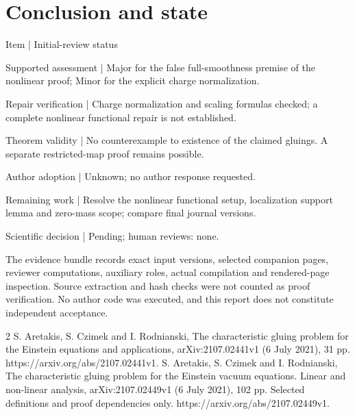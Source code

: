 \documentclass[10pt]{article}
\begin{document}
\section*{Conclusion and state}
Item | Initial-review status\par
Supported assessment | Major for the false full-smoothness premise of the nonlinear proof; Minor for the explicit charge normalization.\par
Repair verification | Charge normalization and scaling formulas checked; a complete nonlinear functional repair is not established.\par
Theorem validity | No counterexample to existence of the claimed gluings. A separate restricted-map proof remains possible.\par
Author adoption | Unknown; no author response requested.\par
Remaining work | Resolve the nonlinear functional setup, localization support lemma and zero-mass scope; compare final journal versions.\par
Scientific decision | Pending; human reviews: none.\par
The evidence bundle records exact input versions, selected companion pages, reviewer computations, auxiliary roles, actual compilation and rendered-page inspection. Source extraction and hash checks were not counted as proof verification. No author code was executed, and this report does not constitute independent acceptance.\par
2 S. Aretakis, S. Czimek and I. Rodnianski, The characteristic gluing problem for the Einstein equations and applications, arXiv:2107.02441v1 (6 July 2021), 31 pp. https://arxiv.org/abs/2107.02441v1. S. Aretakis, S. Czimek and I. Rodnianski, The characteristic gluing problem for the Einstein vacuum equations. Linear and non-linear analysis, arXiv:2107.02449v1 (6 July 2021), 102 pp. Selected definitions and proof dependencies only. https://arxiv.org/abs/2107.02449v1.\par
\end{document}
